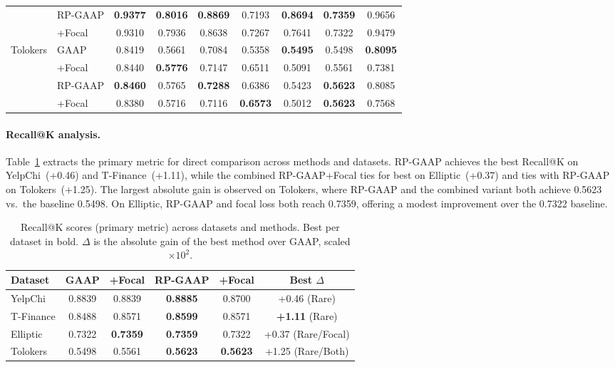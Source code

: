 \begin{table}[h]
{\begin{tabular}{llccccccc}
& RP-GAAP   & \textbf{0.9377} & \textbf{0.8016} & \textbf{0.8869} & 0.7193 & \textbf{0.8694} & \textbf{0.7359} & 0.9656 \\
& +Focal     & 0.9310 & 0.7936 & 0.8638 & 0.7267 & 0.7641 & 0.7322 & 0.9479 \\
\midrule
\multirow{4}{*}{Tolokers} 
& GAAP      & 0.8419 & 0.5661 & 0.7084 & 0.5358 & \textbf{0.5495} & 0.5498 & \textbf{0.8095} \\
& +Focal    & 0.8440 & \textbf{0.5776} & 0.7147 & 0.6511 & 0.5091 & 0.5561 & 0.7381 \\
& RP-GAAP   & \textbf{0.8460} & 0.5765 & \textbf{0.7288} & 0.6386 & 0.5423 & \textbf{0.5623} & 0.8085 \\
& +Focal     & 0.8380 & 0.5716 & 0.7116 & \textbf{0.6573} & 0.5012 & \textbf{0.5623} & 0.7568 \\
\bottomrule
\end{tabular}%
}
\end{table}

\paragraph{Recall@K analysis.}
Table~\ref{tab:recall_at_k} extracts the primary metric for direct comparison across methods and datasets. RP-GAAP achieves the best Recall@K on YelpChi~(+0.46) and T-Finance~(+1.11), while the combined RP-GAAP+Focal ties for best on Elliptic~(+0.37) and ties with RP-GAAP on Tolokers~(+1.25). The largest absolute gain is observed on Tolokers, where RP-GAAP and the combined variant both achieve 0.5623 vs.\ the baseline 0.5498. On Elliptic, RP-GAAP and focal loss both reach 0.7359, offering a modest improvement over the 0.7322 baseline.

\begin{table}[h]
\centering
\caption{Recall@K scores (primary metric) across datasets and methods. Best per dataset in bold. $\Delta$ is the absolute gain of the best method over GAAP, scaled $\times 10^2$.}
\label{tab:recall_at_k}
\begin{tabular}{lcccc|c}
\toprule
Dataset & GAAP & +Focal & RP-GAAP & +Focal & Best $\Delta$ \\
\midrule
YelpChi     & 0.8839 & 0.8839 & \textbf{0.8885} & 0.8700 & +0.46 (Rare) \\
T-Finance   & 0.8488 & 0.8571 & \textbf{0.8599} & 0.8571 & \textbf{+1.11} (Rare) \\
Elliptic    & 0.7322 & \textbf{0.7359} & \textbf{0.7359} & 0.7322 & +0.37 (Rare/Focal) \\
Tolokers    & 0.5498 & 0.5561 & \textbf{0.5623} & \textbf{0.5623} & +1.25 (Rare/Both) \\
\bottomrule
\end{tabular}
\end{table}

